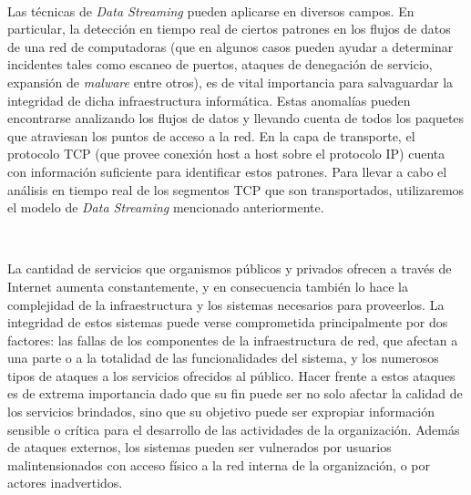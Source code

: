 \documentclass[a4paper,12pt, oneside]{article}
\begin{document}
\

Las técnicas de \textit{Data Streaming} pueden aplicarse en diversos campos. En particular, la detección en tiempo real de ciertos patrones en los flujos de datos de una red de computadoras (que en algunos casos pueden ayudar a determinar incidentes tales como escaneo de puertos, ataques de denegación de servicio, expansión de \textit{malware} entre otros), es de vital importancia para salvaguardar la integridad de dicha infraestructura informática. Estas anomalías pueden encontrarse analizando los flujos de datos y llevando cuenta de todos los paquetes que atraviesan los puntos de acceso a la red. En la capa de transporte, el protocolo TCP (que provee conexión host a host sobre el protocolo IP) cuenta con información suficiente para identificar estos patrones. Para llevar a cabo el análisis en tiempo real de los segmentos TCP que son transportados, utilizaremos el modelo de \textit{Data Streaming} mencionado anteriormente.

\

La cantidad de servicios que organismos públicos y privados ofrecen a través de Internet aumenta constantemente, y en consecuencia también lo hace la complejidad de la infraestructura y los sistemas necesarios para proveerlos. 
La integridad de estos sistemas puede verse comprometida principalmente por dos factores: las fallas de los componentes de la infraestructura de red\cite{Gill:2011:UNF:2043164.2018477}, que afectan a una parte o a la totalidad de las funcionalidades del sistema, y los numerosos tipos de ataques\cite{Karumanchi:2014:WLS:2554850.2555010}\cite{mutchler15:mobilewebapps} a los servicios ofrecidos al público. Hacer frente a estos ataques es de extrema importancia dado que su fin puede ser no solo afectar la calidad de los servicios brindados, sino que su objetivo puede ser expropiar información sensible o crítica para el desarrollo de las actividades de la organización. Además de ataques externos, los sistemas pueden ser vulnerados por usuarios malintensionados con acceso físico a la red interna de la organización, o por actores inadvertidos\cite{Kraemer2007143}\cite{Kraemer2009509}\cite{Liginlal2009215}\cite{Ahmed12humanerrors}.

\
\end{document}
